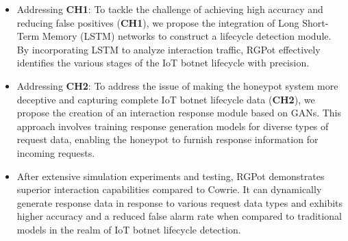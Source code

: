 \documentclass[journal]{IEEEtai}
\begin{document}
\begin{itemize}
    \item Addressing \textbf{CH1}: To tackle the challenge of achieving high accuracy and reducing false positives (\textbf{CH1}), we propose the integration of Long Short-Term Memory (LSTM) networks to construct a lifecycle detection module. 
    By incorporating LSTM to analyze interaction traffic, RGPot effectively identifies the various stages of the IoT botnet lifecycle with precision.

    \item Addressing \textbf{CH2}: To address the issue of making the honeypot system more deceptive and capturing complete IoT botnet lifecycle data (\textbf{CH2}), we propose the creation of an interaction response module based on GANs. 
    This approach involves training response generation models for diverse types of request data, enabling the honeypot to furnish response information for incoming requests.

    \item After extensive simulation experiments and testing, RGPot demonstrates superior interaction capabilities compared to Cowrie. 
    It can dynamically generate response data in response to various request data types and exhibits higher accuracy and a reduced false alarm rate when compared to traditional models in the realm of IoT botnet lifecycle detection.
    
\end{itemize}
\end{document}
